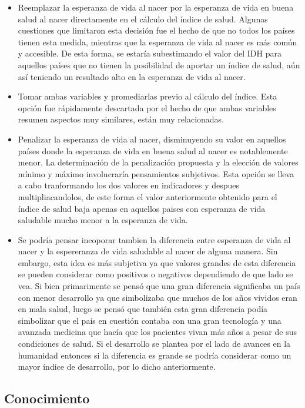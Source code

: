 \documentclass[
  10pt,
]{article}
\begin{document}
\begin{itemize}
\item
  Reemplazar la esperanza de vida al nacer por la esperanza de vida en
  buena salud al nacer directamente en el cálculo del índice de salud.
  Algunas cuestiones que limitaron esta decisión fue el hecho de que no
  todos los países tienen esta medida, mientras que la esperanza de vida
  al nacer es más común y accesible. De esta forma, se estaría
  subestimando el valor del IDH para aquellos países que no tienen la
  posibilidad de aportar un índice de salud, aún así teniendo un
  resultado alto en la esperanza de vida al nacer.
\item
  Tomar ambas variables y promediarlas previo al cálculo del índice.
  Esta opción fue rápidamente descartada por el hecho de que ambas
  variables resumen aspectos muy similares, están muy relacionadas.
\item
  Penalizar la esperanza de vida al nacer, disminuyendo su valor en
  aquellos países donde la esperanza de vida en buena salud al nacer es
  notablemente menor. La determinación de la penalización propuesta y la
  elección de valores mínimo y máximo involucraría pensamientos
  subjetivos. Esta opción se lleva a cabo tranformando los dos valores
  en indicadores y despues multipliacandolos, de este forma el valor
  anteriormente obtenido para el índice de salud baja apenas en aquellos
  paises con esperanza de vida saludable mucho menor a la esperanza de
  vida.
\item
  Se podría pensar incoporar tambien la diferencia entre esperanza de
  vida al nacer y la espereranza de vida saludable al nacer de alguna
  manera. Sin embargo, esta idea es más subjetiva ya que valores grandes
  de esta diferencia se pueden considerar como positivos o negativos
  dependiendo de que lado se vea. Si bien primarimente se pensó que una
  gran diferencia significaba un país con menor desarrollo ya que
  simbolizaba que muchos de los años vividos eran en mala salud, luego
  se pensó que también esta gran diferencia podía simbolizar que el país
  en cuestión contaba con una gran tecnología y una avanzada medicina
  que hacía que los pacientes vivan más años a pesar de sus condiciones
  de salud. Si el desarrollo se plantea por el lado de avances en la
  humanidad entonces si la diferencia es grande se podría considerar
  como un mayor índice de desarrollo, por lo dicho anteriormente.
\end{itemize}

\hypertarget{conocimiento-1}{%
\subsection{Conocimiento}\label{conocimiento-1}}
\end{document}
